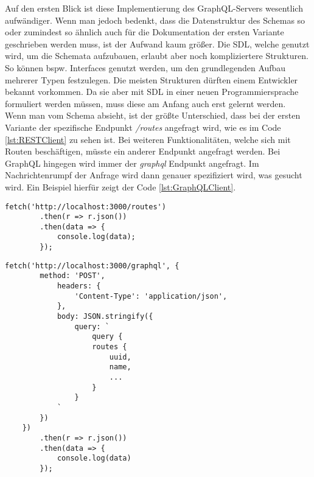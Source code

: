 Auf den ersten Blick ist diese Implementierung des GraphQL-Servers wesentlich aufwändiger. Wenn man jedoch bedenkt, dass die Datenstruktur des Schemas so oder zumindest so ähnlich auch für die Dokumentation der ersten Variante geschrieben werden muss, ist der Aufwand kaum größer.  Die \ac{SDL}, welche genutzt wird, um die Schemata aufzubauen, erlaubt aber noch kompliziertere Strukturen. So können bspw. Interfaces genutzt werden, um den grundlegenden Aufbau mehrerer Typen festzulegen. Die meisten Strukturen dürften einem Entwickler bekannt vorkommen. Da sie aber mit \ac{SDL} in einer neuen Programmiersprache formuliert werden müssen, muss diese am Anfang auch erst gelernt werden. \\
Wenn man vom Schema absieht, ist der größte Unterschied, dass bei der ersten Variante der spezifische Endpunkt \textit{/routes} angefragt wird, wie es im Code \ref{lst:RESTClient} zu sehen ist. Bei weiteren Funktionalitäten, welche sich mit Routen beschäftigen, müsste ein anderer Endpunkt angefragt werden. Bei GraphQL hingegen wird immer der \textit{graphql} Endpunkt angefragt. Im Nachrichtenrumpf der Anfrage wird dann genauer spezifiziert wird, was gesucht wird. Ein Beispiel hierfür zeigt der Code \ref{lst:GraphQLClient}. 

\begin{lstlisting}[caption={REST Client Implementierung},captionpos=b,label=lst:RESTClient] 
	fetch('http://localhost:3000/routes')
		.then(r => r.json())
		.then(data => {
			console.log(data);
		});
\end{lstlisting}

\begin{lstlisting}[caption={GraphQL Client Implementierung},captionpos=b,label=lst:GraphQLClient] 
	fetch('http://localhost:3000/graphql', {
	   	method: 'POST',
	    	headers: {
	      		'Content-Type': 'application/json',
	    	},
	    	body: JSON.stringify({
	      		query: `
	      			query { 
					routes { 
						uuid, 
						name,
						...
					} 
				}
			`
		})
	})
		.then(r => r.json())
		.then(data => {
			console.log(data)
		});
\end{lstlisting}

